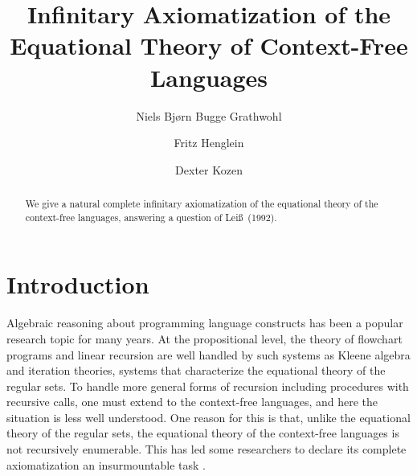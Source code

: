 \documentclass[copyright,creativecommons]{eptcs}
\theoremstyle{remark}
\newcommand{\fhcomment}[1]{\textcolor{red}{[\textbf{Comment (FH)}: {#1}]}}
\newcommand{\dkcomment}[1]{\textcolor{blue}{[\textbf{Comment (DK)}: {#1}]}}
\renewcommand{\fhcomment}[1]{}
\renewcommand{\dkcomment}[1]{}
\begin{document}
\title{Infinitary Axiomatization of the Equational Theory of Context-Free Languages}
\author{Niels Bj\o rn Bugge Grathwohl
\and
Fritz Henglein
\and
Dexter Kozen
}
\def\titlerunning{Infinitary Axiomatization of the Equational Theory of Context-Free Languages}
\def\authorrunning{N.B.B.~Grathwohl, F.~Henglein, D.~Kozen}

\maketitle

\begin{abstract}
We give a natural complete infinitary axiomatization of the equational theory of the context-free languages, answering a question of Lei\ss\ (1992).
\end{abstract}

\section{Introduction}
\label{sec:intro}

Algebraic reasoning about programming language constructs has been a popular research topic for many years. At the propositional level, the theory of flowchart programs and linear recursion are well handled by such systems as 
\fhcomment{Write: affine instead of linear}\dkcomment{I believe linear recursion is standard terminology.\\
http://www.csse.monash.edu.au/~lloyd/tildeAlgDS/Recn/Linear/ \\
http://mitpress.mit.edu/sicp/chapter1/node12.html \\
http://www.sparknotes.com/cs/recursion/whatisrecursion/section2.rhtml}\fhcomment{You win.  How did we ever end up calling something like $a x + b$, with $b \neq 0$, a linear function...}Kleene algebra and iteration theories, systems that characterize the equational theory of the regular sets. To handle more general forms of recursion including procedures with recursive calls, one must extend to the context-free languages, and here the situation is less well understood. One reason for this is that, unlike the equational theory of the regular sets, the equational theory of the context-free languages is not recursively enumerable. This has led some researchers to declare its complete axiomatization an insurmountable task \cite{leiss92b}.
\end{document}
